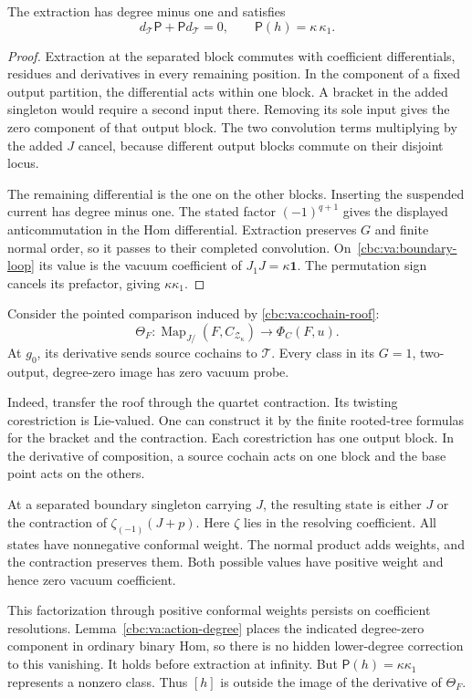 \begin{lemma}\label{cbc:va:vacuum-probe}
The extraction has degree minus one and satisfies
\[
 d_{\mathcal T}\mathsf P+\mathsf P d_{\mathcal T}=0,
 \qquad \mathsf P(h)=\kappa\,\kappa_1.
\]
\end{lemma}
\begin{proof}
Extraction at the separated block commutes with
coefficient differentials, residues and derivatives
in every remaining position. In the component of a
fixed output partition, the differential acts within
one block. A bracket in the added singleton would
require a second input there. Removing its sole
input gives the zero component of that output block.
The two convolution terms multiplying by the added
$J$ cancel, because different output blocks commute
on their disjoint locus.

The remaining differential is the one on the other
blocks. Inserting the suspended current has degree
minus one. The stated factor $(-1)^{q+1}$ gives the
displayed anticommutation in the Hom differential.
Extraction preserves $G$ and finite normal order,
so it passes to their completed convolution.
On~\eqref{cbc:va:boundary-loop} its value is the
vacuum coefficient of $J_1J=\kappa\mathbf1$.
The permutation sign cancels its prefactor, giving
$\kappa\kappa_1$.
\end{proof}

Consider the pointed comparison induced by
\eqref{cbc:va:cochain-roof}:
\[
 \Theta_F:\operatorname{Map}_{J/}
                 (F,C_{\mathcal Z_\kappa})
                \longrightarrow\Phi_C(F,u).
\]
At $g_0$, its derivative sends source cochains to
$\mathcal T$. Every class in its $G=1$, two-output,
degree-zero image has zero vacuum probe.

Indeed, transfer the roof through the quartet
contraction. Its twisting corestriction is Lie-valued.
One can construct it by the finite rooted-tree
formulas for the bracket and the contraction.
Each corestriction has one output block.
In the derivative of composition, a source cochain
acts on one block and the base point acts on the others.

At a separated boundary singleton carrying $J$,
the resulting state is either $J$ or the contraction
of $\zeta_{(-1)}(J+p)$. Here $\zeta$ lies in the
resolving coefficient.
All states have nonnegative conformal weight.
The normal product adds weights, and the contraction
preserves them. Both possible values have positive
weight and hence zero vacuum coefficient.

This factorization through positive conformal weights
persists on coefficient resolutions.
Lemma~\ref{cbc:va:action-degree} places the indicated
degree-zero component in ordinary binary Hom, so
there is no hidden lower-degree correction to this
vanishing. It holds before extraction at infinity.
But $\mathsf P(h)=\kappa\kappa_1$ represents a
nonzero class. Thus $[h]$ is outside the image of
the derivative of $\Theta_F$.

